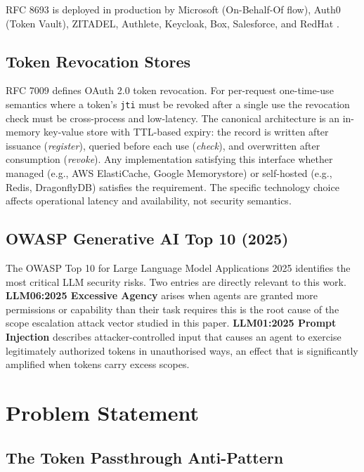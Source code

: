 \documentclass[journal]{IEEEtran}
\begin{document}
RFC 8693 is deployed in production by Microsoft (On-Behalf-Of flow), Auth0
(Token Vault), ZITADEL, Authlete, Keycloak, Box, Salesforce, and
RedHat \cite{rfc8693_deploy}.

\subsection{Token Revocation Stores}

RFC 7009 \cite{rfc7009} defines OAuth 2.0 token revocation. For per-request
one-time-use semantics where a token's \texttt{jti} must be revoked after a
single use the revocation check must be cross-process and low-latency. The
canonical architecture is an in-memory key-value store with TTL-based expiry:
the record is written after issuance (\textit{register}), queried before each
use (\textit{check}), and overwritten after consumption (\textit{revoke}). Any
implementation satisfying this interface whether managed (e.g., AWS
ElastiCache, Google Memorystore) or self-hosted (e.g., Redis, DragonflyDB) 
satisfies the requirement. The specific technology choice affects operational
latency and availability, not security semantics.

\subsection{OWASP Generative AI Top 10 (2025)}

The OWASP Top 10 for Large Language Model Applications 2025 \cite{owasp_genai}
identifies the most critical LLM security risks. Two entries are directly
relevant to this work. \textbf{LLM06:2025 Excessive Agency} arises when agents
are granted more permissions or capability than their task requires this is the
root cause of the scope escalation attack vector studied in this paper.
\textbf{LLM01:2025 Prompt Injection} describes attacker-controlled input that
causes an agent to exercise legitimately authorized tokens in unauthorised ways,
an effect that is significantly amplified when tokens carry excess scopes.


\section{Problem Statement}
\label{sec:problem}

\subsection{The Token Passthrough Anti-Pattern}
\end{document}
